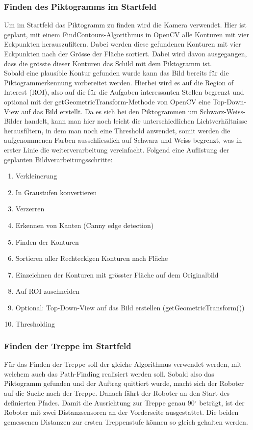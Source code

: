 \subsubsection{Finden des Piktogramms im Startfeld}
\label{Piktogramm-finden-im-Startfeld}
Um im Startfeld das Piktogramm zu finden wird die Kamera verwendet. Hier ist geplant, mit einem FindContours-Algorithmus \cite{OpenCV-Fining-Contours} in OpenCV alle Konturen mit vier Eckpunkten herauszufiltern. Dabei werden diese gefundenen Konturen mit vier Eckpunkten nach der Grösse der Fläche sortiert. Dabei wird davon ausgegangen, dass die grösste dieser Konturen das Schild mit dem Piktogramm ist.\\ 
Sobald eine plausible Kontur gefunden wurde kann das Bild bereits für die Piktogrammerkennung vorbereitet werden. Hierbei wird es auf die Region of Interest (ROI), also auf die für die Aufgaben interessanten Stellen begrenzt und optional mit der getGeometricTransform-Methode von OpenCV eine Top-Down-View auf das Bild erstellt. Da es sich bei den Piktogrammen um Schwarz-Weiss-Bilder handelt, kann man hier noch leicht die unterschiedlichen Lichtverhältnisse herausfiltern, in dem man noch eine Threshold anwendet, somit werden die aufgenommenen Farben ausschliesslich auf Schwarz und Weiss begrenzt, was in erster Linie die weiterverarbeitung vereinfacht.
Folgend eine Auflistung der geplanten Bildverarbeitungsschritte:
\begin{enumerate}
    \item Verkleinerung
    \item In Graustufen konvertieren 
    \item Verzerren
    \item Erkennen von Kanten (Canny edge detection)
    \item Finden der Konturen
    \item Sortieren aller Rechteckigen Konturen nach Fläche
    \item Einzeichnen der Konturen mit grösster Fläche auf dem Originalbild
    \item Auf ROI zuschneiden
    \item Optional: Top-Down-View auf das Bild erstellen (getGeometricTransform())
    \item Thresholding
\end{enumerate}

\subsubsection{Finden der Treppe im Startfeld}
\label{Treppe-finden-im-Startfeld}
Für das Finden der Treppe soll der gleiche Algorithmus verwendet werden, mit welchem auch das Path-Finding realisiert werden soll. Sobald also das Piktogramm gefunden und der Auftrag quittiert wurde, macht sich der Roboter auf die Suche nach der Treppe. Danach fährt der Roboter an den Start des definierten Pfades. Damit die Ausrichtung zur Treppe genau 90$^\circ$ beträgt, ist der Roboter mit zwei Distanzsensoren an der Vorderseite ausgestattet. Die beiden gemessenen Distanzen zur ersten Treppenstufe können so gleich gehalten werden.

